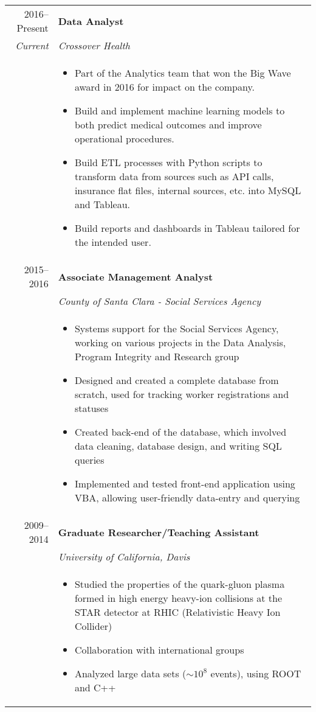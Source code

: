 \documentclass[letterpaper,10pt]{article}
\begin{document}
\begin{tabular}{rp{13cm}}
 	2016--Present & \textbf{Data Analyst} \\
 	\emph{Current} & \emph{Crossover Health} \\
		& 
			\begin{itemize}
            \item Part of the Analytics team that won the Big Wave award in 2016 for impact on the company.
			\item Build and implement machine learning models to both predict medical outcomes and improve operational procedures. %
			\item Build ETL processes with Python scripts to transform data from sources such as API calls, insurance flat files, internal sources, etc. into MySQL and Tableau.  %
			\item Build reports and dashboards in Tableau tailored for the intended user.
			\end{itemize}\\
 
	2015--2016 & \textbf{Associate Management Analyst} \\
 		& \emph{County of Santa Clara - Social Services Agency}\\
		& 
			\begin{itemize}
			\item Systems support for the Social Services Agency, working on various projects in the Data Analysis, Program Integrity and Research group
			\item Designed and created a complete database from scratch, used for tracking worker registrations and statuses
			\item Created back-end of the database, which involved data cleaning, database design, and writing SQL queries
			\item Implemented and tested front-end application using VBA, allowing user-friendly data-entry and querying
			\end{itemize} \\

	2009--2014 & \textbf{Graduate Researcher/Teaching Assistant} \\
 		& \emph{University of California, Davis}\\
		& 
			\begin{itemize}
			\item Studied the properties of the quark-gluon plasma formed in high energy heavy-ion collisions at the STAR detector at RHIC (Relativistic Heavy Ion Collider)
			\item Collaboration with international groups
			\item Analyzed large data sets ($\sim10^8$ events), using ROOT and C++
			\end{itemize} %
	

\end{tabular}
\end{document}
